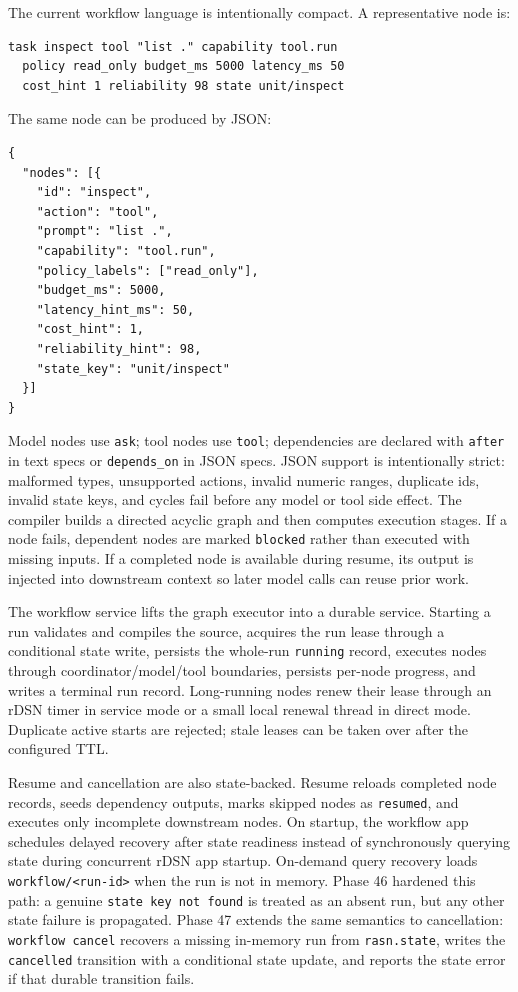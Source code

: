 \documentclass[manuscript,screen,review]{acmart}
\newcommand{\rdsn}{rDSN\xspace}
\begin{document}
The current workflow language is intentionally compact. A representative node is:

\begin{lstlisting}
task inspect tool "list ." capability tool.run
  policy read_only budget_ms 5000 latency_ms 50
  cost_hint 1 reliability 98 state unit/inspect
\end{lstlisting}

The same node can be produced by JSON:

\begin{lstlisting}
{
  "nodes": [{
    "id": "inspect",
    "action": "tool",
    "prompt": "list .",
    "capability": "tool.run",
    "policy_labels": ["read_only"],
    "budget_ms": 5000,
    "latency_hint_ms": 50,
    "cost_hint": 1,
    "reliability_hint": 98,
    "state_key": "unit/inspect"
  }]
}
\end{lstlisting}

Model nodes use \texttt{ask}; tool nodes use \texttt{tool}; dependencies are
declared with \texttt{after} in text specs or \texttt{depends\_on} in JSON
specs. JSON support is intentionally strict: malformed types, unsupported
actions, invalid numeric ranges, duplicate ids, invalid state keys, and cycles
fail before any model or tool side effect. The compiler builds a directed
acyclic graph and then computes execution stages. If a node fails, dependent
nodes are marked \texttt{blocked} rather than executed with missing inputs. If a
completed node is available during resume, its output is injected into downstream
context so later model calls can reuse prior work.

The workflow service lifts the graph executor into a durable service. Starting a
run validates and compiles the source, acquires the run lease through a
conditional state write, persists the whole-run \texttt{running} record,
executes nodes through coordinator/model/tool boundaries, persists per-node
progress, and writes a terminal run record. Long-running nodes renew their lease
through an rDSN timer in service mode or a small local renewal thread in direct
mode. Duplicate active starts are rejected; stale leases can be taken over after
the configured TTL.

Resume and cancellation are also state-backed. Resume reloads completed node
records, seeds dependency outputs, marks skipped nodes as \texttt{resumed}, and
executes only incomplete downstream nodes. On startup, the workflow app
schedules delayed recovery after state readiness instead of synchronously
querying state during concurrent \rdsn app startup. On-demand query recovery
loads \texttt{workflow/<run-id>} when the run is not in memory. Phase 46
hardened this path: a genuine \texttt{state key not found} is treated as an
absent run, but any other state failure is propagated. Phase 47 extends the same
semantics to cancellation: \texttt{workflow cancel} recovers a missing
in-memory run from \texttt{rasn.state}, writes the \texttt{cancelled} transition
with a conditional state update, and reports the state error if that durable
transition fails.
\end{document}
